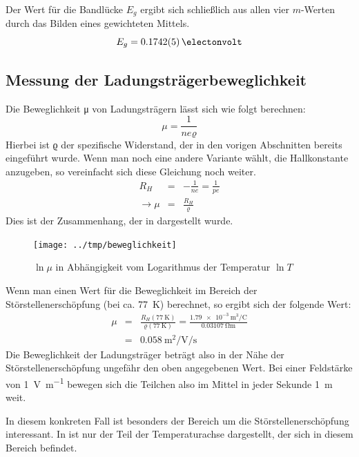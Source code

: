 Der Wert für die Bandlücke $E_g$ ergibt sich schließlich aus allen vier $m$-Werten durch
das Bilden eines gewichteten Mittels.
\begin{equation}
 E_g = \SI{0.1742(5)}{\electonvolt}
\end{equation}



\subsection{Messung der Ladungsträgerbeweglichkeit}

Die Beweglichkeit μ von Ladungsträgern lässt sich wie folgt berechnen:
\begin{equation}
μ = \frac{1}{neϱ}
\end{equation}
Hierbei ist ϱ der spezifische Widerstand, der in den vorigen Abschnitten
bereits eingeführt wurde. Wenn man noch eine andere Variante wählt, die
Hallkonstante anzugeben, so vereinfacht sich diese Gleichung noch weiter.
\begin{eqnarray}
R_H &=& -\frac{1}{ne} = \frac{1}{pe}\\
\rightarrow μ &=& \frac{R_H}{ϱ}
\end{eqnarray}
Dies ist der Zusammenhang, der in  dargestellt wurde.

\begin{figure}[htb]
   \centering
   \texttt{[image: ../tmp/beweglichkeit]}
   \caption{$\ln μ$ in Abhängigkeit vom Logarithmus der Temperatur $\ln T$}
   \label{fig:beweglichkeit}
\end{figure}

Wenn man einen Wert für die Beweglichkeit im Bereich der Störstellenerschöpfung
(bei ca. \SI{77}{\kelvin}) berechnet, so ergibt sich der folgende Wert:
\begin{eqnarray}
μ &=& \frac{R_H(\SI{77}{\kelvin})}{ϱ(\SI{77}{\kelvin})} =
\frac{\SI{1,79e-3}{\meter\cubed\per\coulomb}}{\SI{0.03107}{\ohm\meter}}\\
&=& \SI{0.058}{\meter\squared\per\volt\per\second}
\end{eqnarray}
Die Beweglichkeit der Ladungsträger beträgt also in der Nähe der
Störstellenerschöpfung ungefähr den oben angegebenen Wert. Bei einer Feldstärke
von \SI{1}{\volt\per\meter} bewegen sich die Teilchen also im Mittel in jeder
Sekunde \SI{1}{\meter} weit.

In diesem konkreten Fall ist besonders der Bereich um die
Störstellenerschöpfung interessant. In  ist nur
der Teil der Temperaturachse dargestellt, der sich in diesem Bereich befindet.

